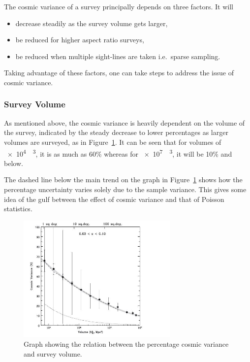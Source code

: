 		The cosmic variance of a survey principally depends on three factors. It will
		\begin{itemize}
			\item decrease steadily as the survey volume gets larger,
			\item be reduced for higher aspect ratio surveys,
			\item be reduced when multiple sight-lines are taken i.e.\ sparse sampling.
		\end{itemize}
		Taking advantage of these factors, one can take steps to address the issue of cosmic variance.

		\subsubsection{Survey Volume} %
		\label{ssub:survey_volume}
			As mentioned above, the cosmic variance is heavily dependent on the volume of the survey, indicated by the steady decrease to lower percentages as larger volumes are surveyed, as in Figure~\ref{fig:cv1}. It can be seen that for volumes of \SI{e4}{\mega\parsec\cubed}, it is as much as 60\% whereas for \SI{e7}{\mega\parsec\cubed}, it will be 10\% and below.

			The dashed line below the main trend on the graph in Figure~\ref{fig:cv1} shows how the percentage uncertainty varies solely due to the sample variance. This gives some idea of the gulf between the effect of cosmic variance and that of Poisson statistics.
			\begin{figure}
				\centering
				\includegraphics[width=0.7\textwidth]{../Images/cosmic_variance1.JPG}
				\caption{Graph showing the relation between the percentage cosmic variance and survey volume.\label{fig:cv1}}
			\end{figure}

